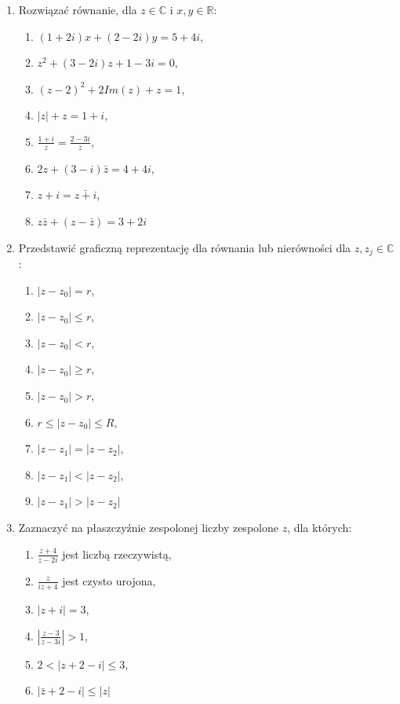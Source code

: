 \documentclass{article}
\begin{document}
\begin{enumerate}
    \item Rozwiązać równanie, dla $z\in\mathbb{C}$ i $x, y\in\mathbb{R}$:
    \begin{enumerate}
        \item $(1 + 2i)x + (2-2i)y = 5 + 4i$,
        \item $z^{2} + (3-2i)z + 1 -3i = 0$,
        \item $(z-2)^{2} + 2 Im(z) + z = 1$,
        \item $|z| + z = 1 + i$,
        \item $\frac{1+i}{z} = \frac{2-3i}{\bar{z}}$,
        \item $2z + (3-i)\bar{z} = 4 + 4i$,
        \item $z + i = \bar{z+i}$,
        \item $z\bar{z} + (z - \bar{z}) = 3 + 2i$
    \end{enumerate}

    \item Przedstawić graficzną reprezentację dla równania lub nierówności dla $z, z_{j} \in \mathbb{C}$:
    \begin{enumerate}
        \item $|z-z_{0}| = r$,
        \item $|z-z_{0}| \leq r$,
        \item $|z-z_{0}| < r$,
        \item $|z-z_{0}| \geq r$,
        \item $|z-z_{0}| > r$,
        \item $r \leq |z-z_{0}| \leq R$,
        \item $|z-z_{1}| = |z-z_{2}|$,
        \item $|z-z_{1}| < |z-z_{2}|$,
        \item $|z-z_{1}| > |z-z_{2}|$
    \end{enumerate}

    \item Zaznaczyć na płaszczyźnie zespolonej liczby zespolone $z$, dla których:
    \begin{enumerate}
        \item $\frac{z+4}{z-2i}$ jest liczbą rzeczywistą,
        \item $\frac{z}{iz + 4}$ jest czysto urojona,
        \item $|z+i|=3$,
        \item $|\frac{z-3}{z-3i}|>1$,
        \item $2 < |z+2-i|\leq 3$,
        \item $|\bar{z} + 2 -i| \leq |z|$
    \end{enumerate}


\end{enumerate}
\end{document}
